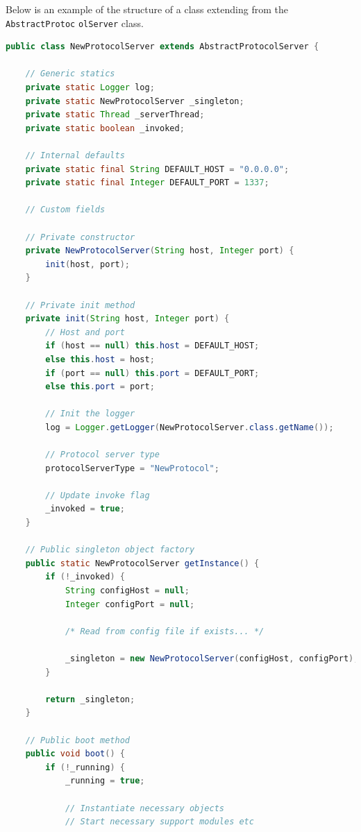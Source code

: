Below is an example of the structure of a class extending from the \verb!AbstractProtoc! \verb!olServer! class.

\begin{lstlisting}[language=Java, captionpos=b, caption=Adding a new protocol, frame=bt, showstringspaces=false]
public class NewProtocolServer extends AbstractProtocolServer {

    // Generic statics
    private static Logger log;
    private static NewProtocolServer _singleton;
    private static Thread _serverThread;
    private static boolean _invoked;
    
    // Internal defaults
    private static final String DEFAULT_HOST = "0.0.0.0";
    private static final Integer DEFAULT_PORT = 1337;
    
    // Custom fields
    
    // Private constructor
    private NewProtocolServer(String host, Integer port) {
        init(host, port);
    }
    
    // Private init method
    private init(String host, Integer port) {
        // Host and port
        if (host == null) this.host = DEFAULT_HOST;
        else this.host = host;
        if (port == null) this.port = DEFAULT_PORT;
        else this.port = port;
        
        // Init the logger
        log = Logger.getLogger(NewProtocolServer.class.getName());
        
        // Protocol server type
        protocolServerType = "NewProtocol";
        
        // Update invoke flag
        _invoked = true;
    }
    
    // Public singleton object factory
    public static NewProtocolServer getInstance() {
        if (!_invoked) {
            String configHost = null;
            Integer configPort = null;
            
            /* Read from config file if exists... */
            
            _singleton = new NewProtocolServer(configHost, configPort);
        }
        
        return _singleton;
    }
    
    // Public boot method
    public void boot() {
        if (!_running) {
            _running = true;
            
            // Instantiate necessary objects
            // Start necessary support modules etc
            

\end{lstlisting}
